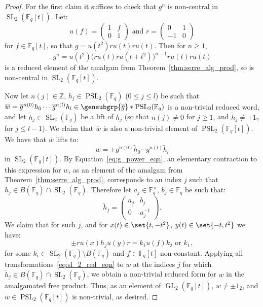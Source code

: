 \documentclass[a4paper,11pt]{amsproc}
\newcommand{\ints}{\mathbb{Z}}%
\newcommand{\finfield}{\mathbb{F}}%
\DeclareMathOperator{\GL}{GL}%
\DeclareMathOperator{\SL}{SL}%
\DeclareMathOperator{\PSL}{PSL}%
\theoremstyle{plain}
\theoremstyle{definition}
\begin{document}
	\begin{proof}
		For the first claim it suffices to check that $g^n$ is non-central in $\SL_2(\finfield_q[t])$. Let: 
		$$
		u(f)=\begin{pmatrix} 1 & f \\ 0 & 1 \end{pmatrix}\text{ and }
		r=\begin{pmatrix} 0 & 1 \\ -1 & 0 \end{pmatrix}
		$$ 
		for $f\in\finfield_q[t]$, so that $g = u(t^2)ru(t)ru(t)$. Then for $n\geq 1$, 
		\begin{equation}\label{eq:g_power_eqn}
			g^n = u(t^2)\big( ru(t)ru(t+t^2)\big)^{n-1}ru(t)ru(t)
		\end{equation}
		is a reduced element of the amalgam from Theorem~\ref{thm:serre_alg_prod}, so is non-central in $\SL_2(\finfield_q[t])$. 
		
		Now let $n(j)\in\ints$, $h_j\in\PSL_2(\finfield_q)$ ($0\leq j\leq l$) be such that $\overline{w}=\overline{g}^{n(0)} h_0\cdots\overline{g}^{n(l)} h_l\in\gensubgrp{\overline{g}}\ast\PSL_2(\finfield_q)$ is a non-trivial reduced word, 
		and let $\tilde{h}_j\in\SL_2(\finfield_q)$ be a lift of $h_j$ (so that $n(j)\neq 0$ for $j\geq 1$, and $\tilde{h}_j\neq\pm 1_2$ for $j\leq l-1$). We claim that $\overline{w}$ is also a non-trivial element of $\PSL_2(\finfield_q[t])$. We have that $\overline{w}$ lifts to: 
		$$
		w=\pm g^{n(0)}\tilde{h}_0\cdots g^{n(l)}\tilde{h}_l
		$$
		in $\SL_2(\finfield_q[t])$. By Equation~\eqref{eq:g_power_eqn}, an elementary contraction to this expression for $w$, as an element of the amalgam from Theorem~\ref{thm:serre_alg_prod}, corresponds to an index $j$ such that $\tilde{h}_j\in B(\finfield_q)\cap\SL_2(\finfield_q)$. Therefore let $a_j\in\finfield_q^\times$, $b_j\in\finfield_q$ be such that:  
		$$
		\tilde{h}_j =
		\begin{pmatrix}
			a_j & b_j \\ 0 & a_j^{-1}
		\end{pmatrix}. 
		$$
		We claim that for such $j$, and for $x(t)\in\set{t,-t^2}$, $y(t)\in\set{-t,t^2}$ we have: 
		\begin{equation} \label{eq:sl_2_red_eqn}
			\pm r u(x) h_j u(y) r 
			= k_1 u (f) k_2 \text{ or } k_1, 
		\end{equation}
		for some $k_i\in\SL_2(\finfield_q)\setminus B(\finfield_q)$ and $f\in\finfield_q[t]$ non-constant. Applying all transformations~\eqref{eq:sl_2_red_eqn} to $w$ at the indices $j$ for which $\tilde{h}_j\in B(\finfield_q)\cap\SL_2(\finfield_q)$, we obtain a non-trivial reduced form for $w$ in the amalgamated free product. Thus, as an element of $\GL_2(\finfield_q[t])$, $w\neq\pm 1_2$, and $\overline{w}\in\PSL_2(\finfield_q[t])$ is non-trivial, as desired. 
		

\end{proof}
\end{document}
